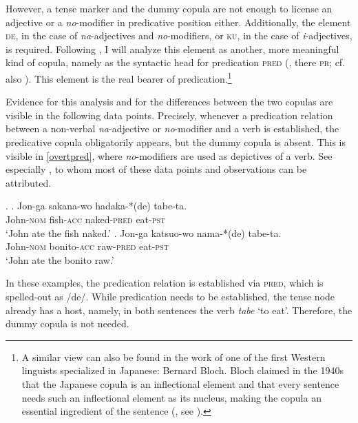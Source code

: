 However, a tense marker and the dummy copula are not enough to license an adjective or a \textit{no}-modifier in predicative position either. Additionally, the element \textsc{de}, in the case of \textit{na}-adjectives and \textit{no}-modifiers, or \textsc{ku}, in the case of \textit{i}-adjectives, is required. Following \citet{nishiyama:1999:adj}, I will analyze this element as another, more meaningful kind of copula, namely as the syntactic head for predication \textsc{pred} (\citealt{bowers:1993:predication}, there \textsc{pr}; cf. also \citealt{svenonius:1996:pred, bowers:2002:pred, dikken:2006:relators, heycock:2013:syntax}). This element is the real bearer of predication.\footnote{A similar view can also be found in the work of one of the first Western linguists specialized in Japanese: Bernard Bloch. Bloch claimed in the 1940s that the Japanese copula is an inflectional element and that every sentence needs such an inflectional element as its nucleus, making the copula an essential ingredient of the sentence (\citealt[35]{bloch:1970:bloch}, see \citealt[187–188]{nishiyama:1999:adj}).}

Evidence for this analysis and for the differences between the two copulas are visible in the following data points. Precisely, whenever a predication relation between a non-verbal \textit{na}-adjective or \textit{no}-modifier and a verb is established, the predicative copula obligatorily appears, but the dummy copula is absent. This is visible in \ref{overtpred}, where \textit{no}-modifiers are used as depictives of a verb. See especially \citet{koizumi:1995:secondary}, to whom most of these data points and observations can be attributed.

\ex. \label{overtpred} \ag. Jon-ga sakana-wo hadaka-*(de) tabe-ta.\\
John-\textsc{nom} fish-\textsc{acc} naked-\textsc{pred} eat-\textsc{pst}\\
`John ate the fish naked.' \null\hfill \citep[188]{nishiyama:1999:adj}
\bg. Jon-ga katsuo-wo nama-*(de) tabe-ta.\\
John-\textsc{nom} bonito-\textsc{acc} raw-\textsc{pred} eat-\textsc{pst}\\
`John ate the bonito raw.' \null \hfill \citep[27]{koizumi:1995:secondary}

In these examples, the predication relation is established via \textsc{pred}, which is spelled-out as /de/. While predication needs to be established, the tense node already has a host, namely, in both sentences the verb \textit{tabe} `to eat’. Therefore, the dummy copula is not needed.

